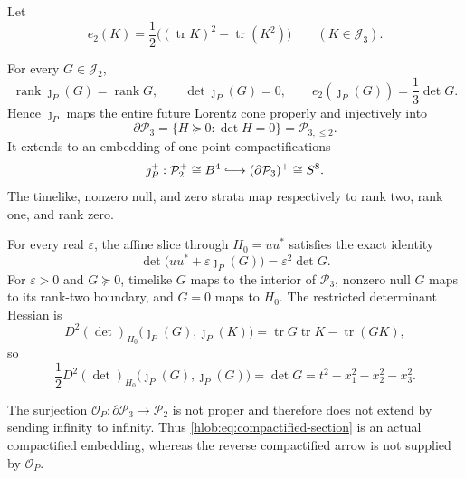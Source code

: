 Let
\begin{equation}
 e_2(K)=\frac12\bigl((\operatorname{tr}K)^2
                         -\operatorname{tr}(K^2)\bigr)
 \qquad(K\in\mathcal J_3).
 \label{hlob:eq:e2}
\end{equation}

\begin{theorem}
\label{hlob:thm:cone-section}
For every \(G\in\mathcal J_2\),
\begin{equation}
 \operatorname{rank}\jmath_P(G)=\operatorname{rank}G,
 \qquad
 \det\jmath_P(G)=0,
 \qquad
 e_2(\jmath_P(G))=\frac13\det G.
 \label{hlob:eq:e2-section}
\end{equation}
Hence \(\jmath_P\) maps the entire future Lorentz cone properly and
injectively into
\begin{equation}
 \partial\mathcal P_3
 =\{H\succeq0:\det H=0\}
 =\mathcal P_{3,\leq2}.
 \label{hlob:eq:rank-loss-boundary}
\end{equation}
It extends to an embedding of one-point compactifications
\begin{equation}
 \jmath_P^+:\mathcal P_2^+\cong B^4
 \lhook\joinrel\longrightarrow
 (\partial\mathcal P_3)^+\cong S^8.
 \label{hlob:eq:compactified-section}
\end{equation}
The timelike, nonzero null, and zero strata map respectively to rank two,
rank one, and rank zero.

For every real \(\varepsilon\), the affine slice through \(H_0=uu^*\)
satisfies the exact identity
\begin{equation}
 \boxed{
 \det\bigl(uu^*+\varepsilon\jmath_P(G)\bigr)
 =\varepsilon^2\det G.}
 \label{hlob:eq:determinant-opening}
\end{equation}
For \(\varepsilon>0\) and \(G\succeq0\), timelike \(G\) maps to the interior
of \(\mathcal P_3\), nonzero null \(G\) maps to its rank-two boundary, and
\(G=0\) maps to \(H_0\).  The restricted determinant Hessian is
\begin{equation}
 D^2(\det)_{H_0}
 \bigl(\jmath_P(G),\jmath_P(K)\bigr)
 =\operatorname{tr}G\operatorname{tr}K-\operatorname{tr}(GK),
 \label{hlob:eq:restricted-hessian}
\end{equation}
so
\begin{equation}
 \frac12D^2(\det)_{H_0}
 \bigl(\jmath_P(G),\jmath_P(G)\bigr)
 =\det G
 =t^2-x_1^2-x_2^2-x_3^2.
 \label{hlob:eq:hessian-lorentz}
\end{equation}

The surjection
\(\mathcal O_P:\partial\mathcal P_3\to\mathcal P_2\) is not proper and
therefore does not extend by sending infinity to infinity.  Thus
\eqref{hlob:eq:compactified-section} is an actual compactified embedding,
whereas the reverse compactified arrow is not supplied by
\(\mathcal O_P\).
\end{theorem}

